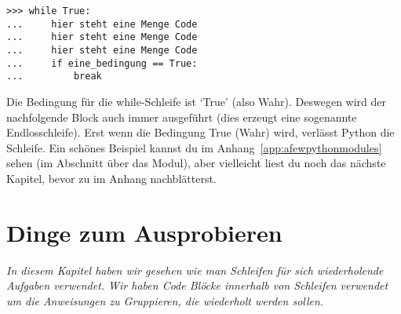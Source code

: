 \begin{Verbatim}[frame=single]
>>> while True:
...     hier steht eine Menge Code
...     hier steht eine Menge Code
...     hier steht eine Menge Code
...     if eine_bedingung == True:
...         break
\end{Verbatim}
Die Bedingung für die while-Schleife ist `True' (also Wahr). Deswegen wird der nachfolgende Block auch immer ausgeführt (dies erzeugt eine sogenannte Endlosschleife). Erst wenn die Bedingung  True (Wahr) wird, verlässt Python die Schleife. Ein schönes Beispiel kannst du im Anhang~\ref{app:afewpythonmodules} sehen (im Abschnitt über das  Modul), aber vielleicht liest du noch das nächste Kapitel, bevor zu im Anhang nachblätterst.


\section{Dinge zum Ausprobieren}

\emph{In diesem Kapitel haben wir gesehen wie man Schleifen für sich wiederholende Aufgaben verwendet. Wir haben Code Blöcke innerhalb von Schleifen verwendet um die Anweisungen zu Gruppieren, die wiederholt werden sollen.}

